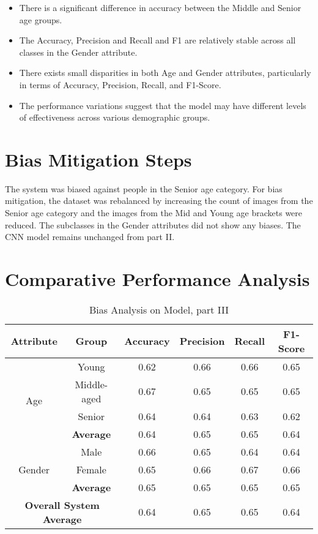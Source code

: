 \begin{itemize}
    \item There is a significant difference in accuracy between the Middle and Senior age groups.
    \item The Accuracy, Precision and Recall and F1 are relatively stable across all classes in the Gender attribute.
    \item There exists small disparities in both Age and Gender attributes, particularly in terms of Accuracy, Precision, Recall, and F1-Score.
    \item The performance variations suggest that the model may have different levels of effectiveness across various demographic groups.
\end{itemize}
\vspace*{1em}
\section{Bias Mitigation Steps}
\noindent The system was biased against people in the Senior age category. For bias mitigation, the dataset was rebalanced by increasing the count of images from the Senior age category and the images from the Mid and Young age brackets were reduced. The subclasses in the Gender attributes did not show any biases. The CNN model remains unchanged from part II.

\section{Comparative Performance Analysis}

\begin{table}[h!]
    \centering
    \begin{tabular}{|c|c|c|c|c|c|}
        \hline
        \textbf{Attribute} & \textbf{Group} & \textbf{Accuracy} & \textbf{Precision} & \textbf{Recall} & \textbf{F1-Score} \\
        \hline
        \multirow{4}{*}{Age} & Young & 0.62 & 0.66 & 0.66 & 0.65 \\
        \cline{2-6}
         & Middle-aged & 0.67 & 0.65 & 0.65 & 0.65 \\
        \cline{2-6}
         & Senior & 0.64 & 0.64 & 0.63 & 0.62 \\
        \cline{2-6}
         & \textbf{Average} & 0.64 & 0.65 & 0.65 & 0.64 \\
        \hline
        \multirow{3}{*}{Gender} & Male & 0.66 & 0.65 & 0.64 & 0.64 \\
        \cline{2-6}
        & Female & 0.65 & 0.66 & 0.67 & 0.66 \\
        \cline{2-6}
        & \textbf{Average} & 0.65 & 0.65 & 0.65 & 0.65 \\
        \hline
        \hline
        \multicolumn{2}{|c|}{\textbf{Overall System Average }} & 0.64 & 0.65 & 0.65 & 0.64 \\
        \hline
    \end{tabular}
    \caption{ Bias Analysis on Model, part III}
    \label{tab:bias-analysis}
\end{table}

